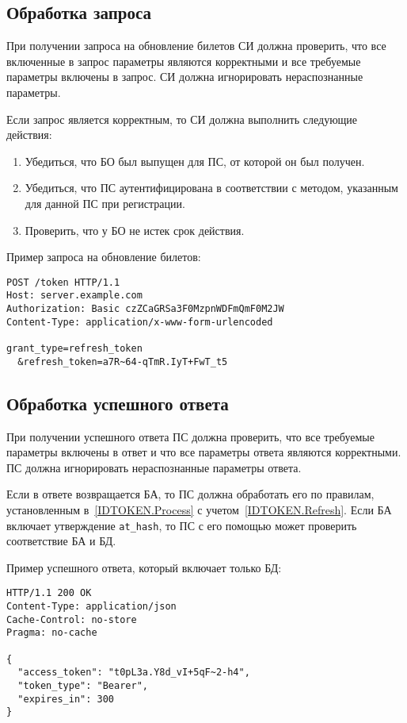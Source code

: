 \label{REQRESP.Refresh}

\subsection{Обработка запроса}\label{REQRESP.Refresh.Req}

При получении запроса на обновление билетов СИ должна проверить, что все 
включенные в запрос параметры являются корректными и все требуемые параметры 
включены в запрос.
%
СИ должна игнорировать нераспознанные параметры.

Если запрос является корректным, то СИ должна выполнить следующие действия:
\begin{enumerate}
\item 
Убедиться, что БО был выпущен для ПС, от которой он был получен.

\item 
Убедиться, что ПС аутентифицирована в соответствии с методом, указанным 
для данной ПС при регистрации.

\item 
Проверить, что у БО не истек срок действия.
\end{enumerate}

Пример запроса на обновление билетов:
\begin{lstlisting}
POST /token HTTP/1.1
Host: server.example.com
Authorization: Basic czZCaGRSa3F0MzpnWDFmQmF0M2JW
Content-Type: application/x-www-form-urlencoded

grant_type=refresh_token
  &refresh_token=a7R~64-qTmR.IyT+FwT_t5
\end{lstlisting}

\subsection{Обработка успешного ответа}\label{REQRESP.Refresh.Resp}

При получении успешного ответа ПС должна проверить, что все
требуемые параметры включены в ответ и что все параметры ответа являются
корректными. ПС должна игнорировать нераспознанные параметры ответа.

Если в ответе возвращается БА, то ПС должна обработать его по правилам, 
установленным в~\ref{IDTOKEN.Process} с учетом~\ref{IDTOKEN.Refresh}. 
%
Если БА включает утверждение \lstinline{at_hash}, то ПС с его помощью 
может проверить соответствие БА и БД.

Пример успешного ответа, который включает только БД:
%
\begin{lstlisting}
HTTP/1.1 200 OK
Content-Type: application/json
Cache-Control: no-store
Pragma: no-cache

{
  "access_token": "t0pL3a.Y8d_vI+5qF~2-h4",
  "token_type": "Bearer",
  "expires_in": 300
}
\end{lstlisting}

